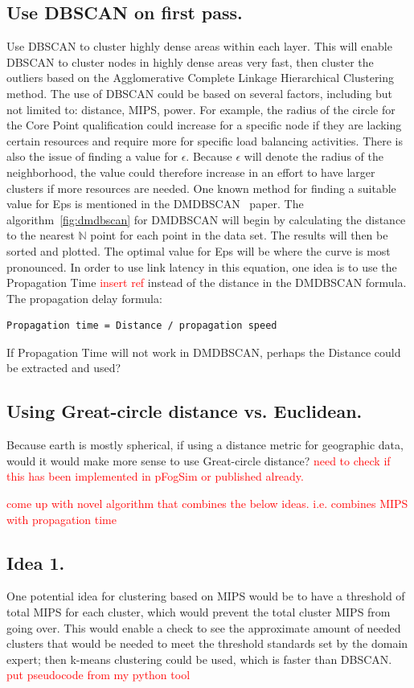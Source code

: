\documentclass[letterpaper,twocolumn,10pt]{article}
\newcommand\todo[1]{\textcolor{red}{#1}}
\begin{document}
\subsection{Use DBSCAN on first pass.}
Use DBSCAN to cluster highly dense areas within each layer. This will enable DBSCAN to cluster nodes in highly dense areas very fast, then cluster the outliers based on the Agglomerative Complete Linkage Hierarchical Clustering method. The use of DBSCAN could be based on several factors, including but not limited to: distance, MIPS, power. For example, the radius of the circle for the Core Point qualification could increase for a specific node if they are lacking certain resources and require more for specific load balancing activities. There is also the issue of finding a value for $\epsilon$. Because $\epsilon$ will denote the radius of the neighborhood, the value could therefore increase in an effort to have larger clusters if more resources are needed. One known method for finding a suitable value for Eps is mentioned in the DMDBSCAN~\cite{dmdbscan} paper. The algorithm~\ref{fig:dmdbscan} for DMDBSCAN will begin by calculating the distance to the nearest $\mathbb{N}$ point for each point in the data set. The results will then be sorted and plotted. The optimal value for Eps will be where the curve is most pronounced. In order to use link latency in this equation, one idea is to use the Propagation Time \todo{insert ref} instead of the distance in the DMDBSCAN formula. The propagation delay formula:
\begin{verbatim}
Propagation time = Distance / propagation speed 
\end{verbatim}
If Propagation Time will not work in DMDBSCAN, perhaps the Distance could be extracted and used?
 
\subsection{Using Great-circle distance vs. Euclidean.}Because earth is mostly spherical, if using a distance metric for geographic data, would it would make more sense to use Great-circle distance? \todo{need to check if this has been implemented in pFogSim or published already.}

\todo{come up with novel algorithm that combines the below ideas. i.e. combines MIPS with propagation time}

\subsection{Idea 1.} One potential idea for clustering based on MIPS would be to have a threshold of total MIPS for each cluster, which would prevent the total cluster MIPS from going over. This would enable a check to see the approximate amount of needed clusters that would be needed to meet the threshold standards set by the domain expert; then k-means clustering could be used, which is faster than DBSCAN. \todo{put pseudocode from my python tool}
\end{document}
